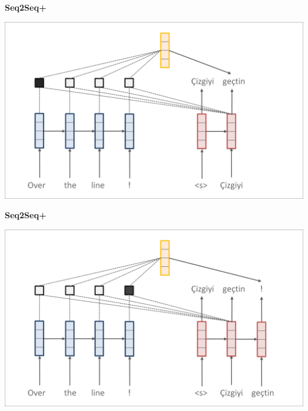 \documentclass[aspectratio=169]{beamer}
\newcommand{\air}{\vspace{0.25cm}}
\begin{document}
\begin{frame}
  \begin{center}
    \textbf{Seq2Seq+} \air

  \end{center}
\center
\vspace{-5mm}
 \air
\includegraphics[scale=0.37]{nmt-attn8}
\end{frame}
\begin{frame}
  \begin{center}
    \textbf{Seq2Seq+} \air

  \end{center}
\center
\vspace{-5mm}
 \air
\includegraphics[scale=0.37]{nmt-attn9}
\end{frame}
\end{document}
